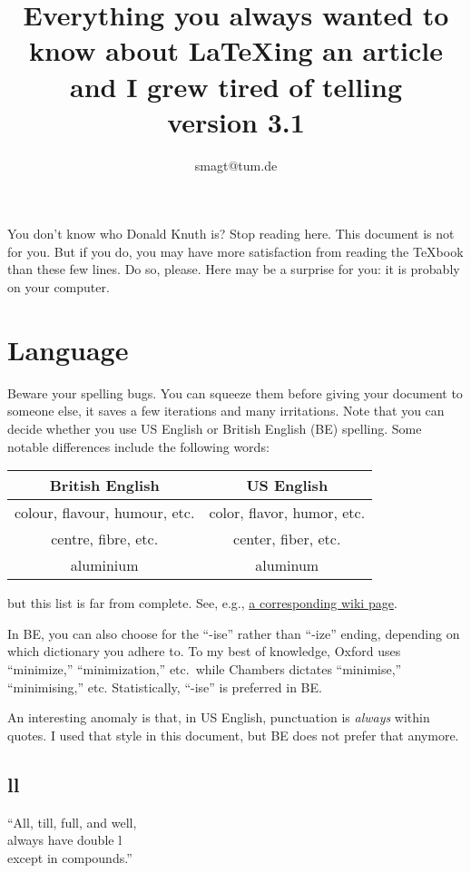 \documentclass{article}
\title{Everything you always wanted to know about \LaTeX ing an article and I grew tired of telling\\[1ex]
\footnotesize{version 3.1}}
\author{smagt@tum.de}
\begin{document}
\maketitle

You don't know who Donald Knuth is?  Stop reading here.  This document is not for you.  But if you do,
you may have more satisfaction from reading the \TeX book than these few lines.   Do so, please.
Here may be a surprise for you: it is probably on your computer.

\section{Language}
Beware your spelling bugs.  You can squeeze them before giving your document to someone else, it saves
a few iterations and many irritations.  Note that you can decide whether you use US English or
British English (BE) spelling.  Some notable differences include the following words:
\begin{center}\begin{tabular}{c|c}
British English & US English \\\hline
colour, flavour, humour, etc.	& color, flavor, humor, etc.\\
centre, fibre, etc.	& center, fiber, etc.\\
aluminium			& aluminum
\end{tabular}\end{center}
but this list is far from complete.  See, e.g., \href{http://en.wikipedia.org/wiki/American_and_British_English_spelling_differences}{a corresponding wiki page}.

In BE, you can also choose for the ``-ise'' rather than ``-ize'' ending, depending on which
dictionary you adhere to.  To my best of knowledge, Oxford uses ``minimize,'' ``minimization,'' etc.\
while Chambers dictates ``minimise,'' ``minimising,'' etc.  Statistically, ``-ise'' is preferred in BE.

An interesting anomaly is that, in US English, punctuation is \textsl{always} within quotes.  
I used that style in this document, but BE does not prefer that anymore.


\subsection{ll}
``All, till, full, and well, \\
always have double l\\
except in compounds.''
\end{document}

